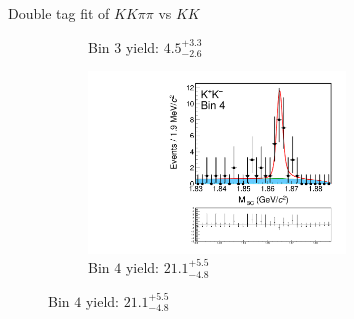 \documentclass{beamer}
\begin{document}
\begin{frame}{Double tag fit of $KK\pi\pi$ vs $KK$}
\begin{figure}
\begin{subfigure}{0.5\textwidth}
      \caption{Bin $3$ yield: $4.5_{-2.6}^{+3.3}$}
    \end{subfigure}%
    \begin{subfigure}{0.5\textwidth}
      \centering
      \includegraphics[width=0.75\textwidth,trim={0 5cm 0 0},clip=true]{Plots/DoubleTagYield_DoubleTag_CP_KKpipi_vs_KK_SignalBin4.pdf}
      \caption{Bin $4$ yield: $21.1_{-4.8}^{+5.5}$}
    \end{subfigure}
  \end{figure}
\end{frame}
\end{document}
